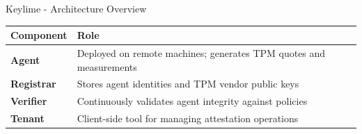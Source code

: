 \begin{frame}{Keylime - Architecture Overview}
  \vspace{0.1cm}

  \begin{center}
    \scriptsize
    \begin{tabular}{|l|p{7cm}|}
      \hline
      \textbf{Component} & \textbf{Role} \\
      \hline
      \textbf{Agent} & Deployed on remote machines; generates TPM quotes and measurements \\
      \hline
      \textbf{Registrar} & Stores agent identities and TPM vendor public keys \\
      \hline
      \textbf{Verifier} & Continuously validates agent integrity against policies \\
      \hline
      \textbf{Tenant} & Client-side tool for managing attestation operations \\
      \hline
    \end{tabular}
  \end{center}
\end{frame}

